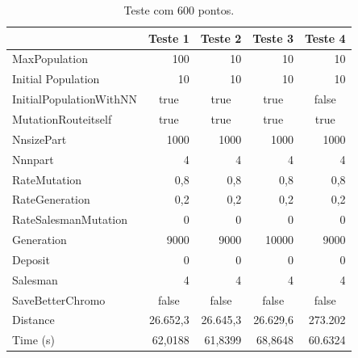 \documentclass{abnt}
\begin{document}
		\begin{table}[htbp]
			\centering
			\begin{tabular}{|l|r|r|r|r|}
				
				\hline
				&Teste 1 &Teste 2 &Teste 3 &Teste 4 \\
				\hline
				MaxPopulation & 100 & 10 & 10 & 10\\ \hline
				Initial Population & 10 & 10 & 10 & 10\\ \hline
				InitialPopulationWithNN & \multicolumn{1}{c|}{true} & \multicolumn{1}{c|}{true} & \multicolumn{1}{c|}{true} & \multicolumn{1}{c|}{false} \\ \hline
				MutationRouteitself & \multicolumn{1}{c|}{true} & \multicolumn{1}{c|}{true} & \multicolumn{1}{c|}{true} & \multicolumn{1}{c|}{true}\\ \hline
				NnsizePart & 1000 & 1000 & 1000 & 1000 \\ \hline
				Nnnpart & 4 & 4 & 4 & 4 \\ \hline
				RateMutation & 0,8 & 0,8 & 0,8 & 0,8 \\ \hline
				RateGeneration & 0,2 & 0,2 & 0,2 & 0,2 \\ \hline
				RateSalesmanMutation & 0 & 0 & 0 & 0 \\ \hline
				Generation & 9000 & 9000 & 10000 & 9000\\ \hline
				Deposit & 0 & 0 & 0 & 0 \\ \hline
				Salesman & 4 & 4 & 4 & 4 \\ \hline
				SaveBetterChromo & \multicolumn{1}{c|}{false} & \multicolumn{1}{c|}{false} & \multicolumn{1}{c|}{false} & \multicolumn{1}{c|}{false} \\ \hline
				Distance & 26.652,3 & 26.645,3 & 26.629,6 & 273.202 \\ \hline
				Time (s) & 62,0188 & 61,8399 & 68,8648  & 60.6324\\ \hline
			\end{tabular}
			\caption{Teste com 600 pontos.}
			\label{tst-01}
			\end{table}
\end{document}
